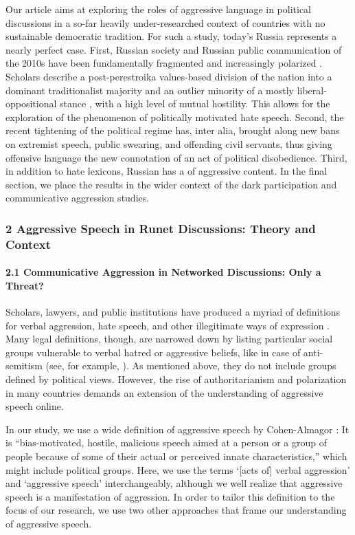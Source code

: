 Our article aims at exploring the roles of aggressive language in political discussions in a so-far heavily under-researched context of countries with no sustainable democratic tradition. For such a study, today’s Russia represents a nearly perfect case. First, Russian society and Russian public communication of the 2010s have been fundamentally fragmented and increasingly polarized \cite{BodrunovaLitvinenko2015}. Scholars describe a post-perestroika values-based division of the nation into a dominant traditionalist majority and an outlier minority of a mostly liberal-oppositional stance \cite{BerezuevZvonareva}, with a high level of mutual hostility. This allows for the exploration of the phenomenon of politically motivated hate speech. Second, the recent tightening of the political regime has, inter alia, brought along new bans on extremist speech, public swearing, and offending civil servants, thus giving offensive language the new connotation of an act of political disobedience. Third, in addition to hate lexicons, Russian has a of aggressive content. In the final section, we place the results in the wider context of the dark participation and communicative aggression studies.

\subsubsection{2 Aggressive Speech in Runet Discussions: Theory and Context}

\paragraph{2.1 Communicative Aggression in Networked Discussions: Only a Threat?} 
Scholars, lawyers, and public institutions have produced a myriad of definitions for verbal aggression, hate speech, and other illegitimate ways of expression \cite{Brown2017a,Brown2017b}. Many legal definitions, though, are narrowed down by listing particular social groups vulnerable to verbal hatred or aggressive beliefs, like in case of anti-semitism (see, for example, \cite[p. 107]{CouncilOfEurope}). As mentioned above, they do not include groups defined by political views. However, the rise of authoritarianism and polarization in many countries demands an extension of the understanding of aggressive speech online.

In our study, we use a wide definition of aggressive speech by Cohen-Almagor \cite[p.~1]{CohenAlmagor}: It is “bias-motivated, hostile, malicious speech aimed at a person or a group of people because of some of their actual or perceived innate characteristics,” which might include political groups. Here, we use the terms ‘[acts of] verbal aggression’ and ‘aggressive speech’ interchangeably, although we well realize that aggressive speech is a manifestation of aggression. In order to tailor this definition to the focus of our research, we use two other approaches that frame our understanding of aggressive speech.

